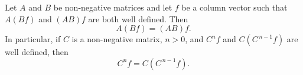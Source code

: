 Let $A$ and $B$ be non-negative matrices and let $f$ be a column vector such that $A(Bf)$ and $(AB)f$ are both well defined. Then
$$A(Bf) = (AB)f.$$
In particular, if $C$ is a non-negative matrix, $n > 0$, and $C^n f$ and $C(C^{\,n-1}f)$ are well defined, then
$$C^n f = C(C^{\,n-1}f).$$
